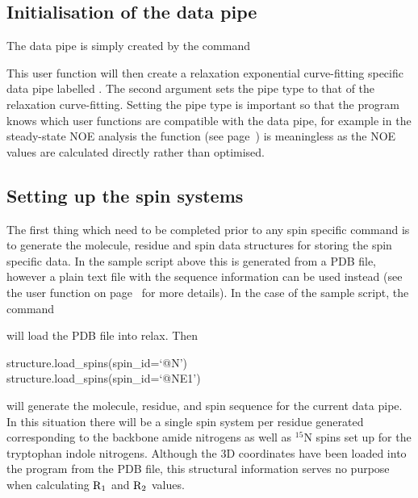 
\subsection{Initialisation of the data pipe} \label{Rx initialisation}

The data pipe is simply created by the command


This user function will then create a relaxation exponential curve-fitting specific data pipe labelled .  The second argument sets the pipe type to that of the relaxation curve-fitting.  Setting the pipe type is important so that the program knows which user functions are compatible with the data pipe, for example in the steady-state NOE analysis the function  (see page~\pageref{uf: minimise}) is meaningless as the NOE values are calculated directly rather than optimised.



\subsection{Setting up the spin systems}

The first thing which need to be completed prior to any spin specific command is to generate the molecule, residue and spin data structures for storing the spin specific data.  In the sample script above this is generated from a PDB file, however a plain text file with the sequence information can be used instead (see the  user function on page~\pageref{uf: sequence.read} for more details).  In the case of the sample script, the command


will load the PDB file  into relax.  Then 

\begin{exampleenv}
structure.load\_spins(spin\_id=`@N') \\
structure.load\_spins(spin\_id=`@NE1')
\end{exampleenv}

will generate the molecule, residue, and spin sequence for the current data pipe.  In this situation there will be a single spin system per residue generated corresponding to the backbone amide nitrogens as well as $^{15}$N spins set up for the tryptophan indole nitrogens.  Although the 3D coordinates have been loaded into the program from the PDB file, this structural information serves no purpose when calculating $\mathrm{R}_1$ and $\mathrm{R}_2$ values.


